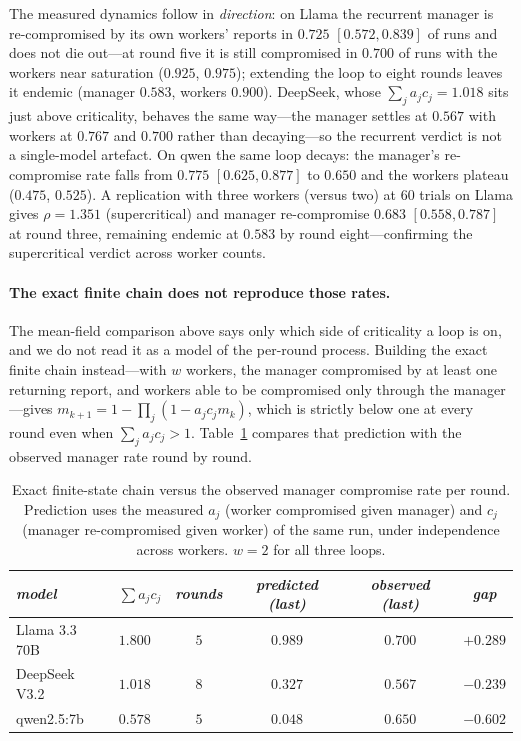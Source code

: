 \documentclass[sigconf,anonymous]{aamas}
\begin{document}
The measured dynamics follow in \emph{direction}: on Llama the recurrent manager is
re-compromised by its own workers' reports in $0.725$ $[0.572, 0.839]$ of runs and does
not die out---at round five it is still compromised in $0.700$ of runs with the workers
near saturation ($0.925$, $0.975$); extending the loop to eight rounds leaves it endemic
(manager $0.583$, workers $0.900$). DeepSeek, whose $\sum_j a_jc_j = 1.018$ sits just
above criticality, behaves the same way---the manager settles at $0.567$ with workers at
$0.767$ and $0.700$ rather than decaying---so the recurrent verdict is not a
single-model artefact. On qwen the same loop decays: the manager's re-compromise rate
falls from $0.775$ $[0.625, 0.877]$ to $0.650$ and the workers plateau ($0.475$,
$0.525$).
A replication with three workers (versus two) at $60$ trials on Llama gives
$\rho = 1.351$ (supercritical) and manager re-compromise $0.683$ $[0.558, 0.787]$ at
round three, remaining endemic at $0.583$ by round eight---confirming the supercritical
verdict across worker counts.



\paragraph{The exact finite chain does not reproduce those rates.} The mean-field
comparison above says only which side of criticality a loop is on, and we do not read it
as a model of the per-round process. Building the exact finite chain instead---with
$w$ workers, the manager compromised by at least one returning report, and workers able
to be compromised only through the manager---gives
$m_{k+1} = 1 - \prod_j (1 - a_j c_j m_k)$, which is strictly below one at every round
even when $\sum_j a_jc_j > 1$. Table~\ref{tab:cyclic-markov} compares that prediction
with the observed manager rate round by round.

\begin{table}[h]
\scriptsize
\centering
\caption{Exact finite-state chain versus the observed manager compromise rate per
round. Prediction uses the measured $a_j$ (worker compromised given manager) and $c_j$
(manager re-compromised given worker) of the same run, under independence across
workers. $w = 2$ for all three loops.}
\vspace{4pt}
\label{tab:cyclic-markov}
\setlength{\tabcolsep}{3pt}
\begin{tabular}{llcccc}
\toprule
\textit{model} & \textit{$\sum a_jc_j$} & \textit{rounds} & \textit{predicted (last)}
& \textit{observed (last)} & \textit{gap} \\
\midrule
Llama 3.3 70B & $1.800$ & $5$ & $0.989$ & $0.700$ & $+0.289$ \\
DeepSeek V3.2 & $1.018$ & $8$ & $0.327$ & $0.567$ & $-0.239$ \\
qwen2.5:7b    & $0.578$ & $5$ & $0.048$ & $0.650$ & $-0.602$ \\
\bottomrule
\end{tabular}
\end{table}
\end{document}
